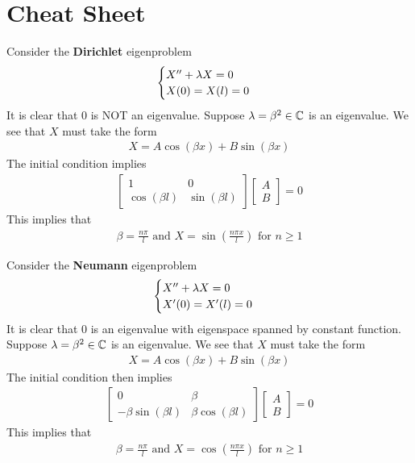 \documentclass{report}
\begin{document}
\section{Cheat Sheet}
\begin{mdframed}
Consider the \textbf{Dirichlet} eigenproblem 
\begin{align*}
\begin{cases}
  X''+ \lambda X=0 \\
  X(0)=X(l)=0
\end{cases}
\end{align*}
It is clear that $0$ is NOT an eigenvalue. Suppose  $\lambda =\beta ^2\in\mathbb{C}$ is an eigenvalue. We see that $X$ must take the form
\begin{align*}
X= A \cos (\beta x)+ B \sin (\beta x)
\end{align*}
The initial condition implies 
\begin{align*}
\begin{bmatrix}
  1 & 0  \\
  \cos (\beta l) & \sin (\beta l)
\end{bmatrix} \begin{bmatrix}
A\\
B
\end{bmatrix}=0 
\end{align*}
This implies that 
\begin{align*}
\beta = \frac{n \pi  }{l}\text{ and } X= \sin ( \frac{n \pi  x}{l})\text{ for }n\geq 1
\end{align*}
\end{mdframed}
\begin{mdframed}
  Consider the \textbf{Neumann} eigenproblem 
\begin{align*}
\begin{cases}
  X'' + \lambda X=0 \\
  X'(0)=X'(l)=0
\end{cases}
\end{align*}
It is clear that $0$ is an eigenvalue with eigenspace spanned by constant function. Suppose $\lambda =\beta ^2\in\mathbb{C}$ is an eigenvalue. We see that $X$ must take the form 
 \begin{align*}
X= A\cos (\beta x) + B\sin (\beta x)
\end{align*}
The initial condition then implies 
\begin{align*}
\begin{bmatrix}
  0 & \beta \\
  -\beta  \sin (\beta l) & \beta  \cos (\beta l)
\end{bmatrix}\begin{bmatrix}
A\\
B
\end{bmatrix}=0 
\end{align*}
This implies that 
\begin{align*}
\beta = \frac{n \pi  }{l} \text{ and }X= \cos (\frac{n \pi  x}{l})\text{ for }n\geq 1
\end{align*}
\end{mdframed}
\end{document}
